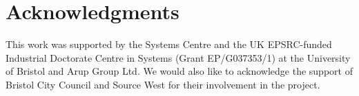 \documentclass[b5paper,10pt]{article}
\begin{document}
\section*{Acknowledgments}

This work was supported by the Systems Centre and the UK EPSRC-funded
Industrial Doctorate Centre in Systems (Grant EP/G037353/1) at the
University of Bristol and Arup Group Ltd. We would also like to
acknowledge the support of Bristol City Council and Source West for
their involvement in the project.




\end{document}
